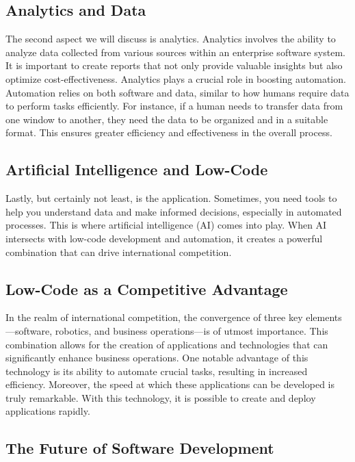 \subsection{Analytics and Data}\label{analytics-and-data}

The second aspect we will discuss is analytics. Analytics involves the
ability to analyze data collected from various sources within an
enterprise software system. It is important to create reports that not
only provide valuable insights but also optimize cost-effectiveness.
Analytics plays a crucial role in boosting automation. Automation relies
on both software and data, similar to how humans require data to perform
tasks efficiently. For instance, if a human needs to transfer data from
one window to another, they need the data to be organized and in a
suitable format. This ensures greater efficiency and effectiveness in
the overall process.

\subsection{Artificial Intelligence and
  Low-Code}\label{artificial-intelligence-and-low-code}

Lastly, but certainly not least, is the
application. Sometimes, you need tools to help you understand data and
make informed decisions, especially in automated processes. This is
where artificial intelligence (AI) comes into play. When AI intersects
with low-code development and automation, it creates a powerful
combination that can drive international competition.

\subsection{Low-Code as a Competitive
  Advantage}\label{low-code-as-a-competitive-advantage}

In the realm of international competition, the convergence of three key
elements---software, robotics, and business operations---is of utmost
importance. This combination allows for the creation of applications and
technologies that can significantly enhance business operations. One
notable advantage of this technology is its ability to automate crucial
tasks, resulting in increased efficiency. Moreover, the speed at which
these applications can be developed is truly remarkable. With this
technology, it is possible to create and deploy applications rapidly.

\subsection{The Future of Software
  Development}\label{the-future-of-software-development}

